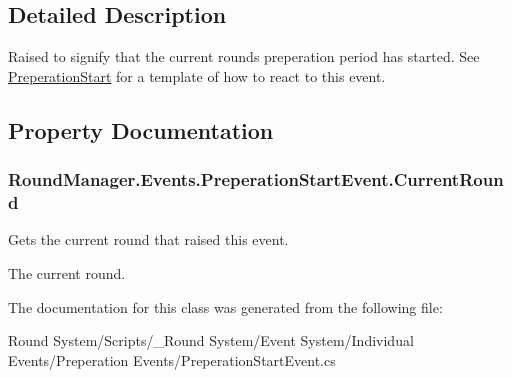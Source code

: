 \subsection{Detailed Description}
Raised to signify that the current rounds preperation period has started. See \hyperlink{class_round_manager_1_1_preperation_start}{Preperation\+Start} for a template of how to react to this event. 



\subsection{Property Documentation}
\hypertarget{class_round_manager_1_1_events_1_1_preperation_start_event_a0636c13306d39f6bcf5bde157012334e}{}
\subsubsection[{Current\+Round}]{ Round\+Manager.\+Events.\+Preperation\+Start\+Event.\+Current\+Round\hspace{0.3cm}{\ttfamily [get]}}\label{class_round_manager_1_1_events_1_1_preperation_start_event_a0636c13306d39f6bcf5bde157012334e}


Gets the current round that raised this event. 

The current round.

The documentation for this class was generated from the following file\+:\begin{DoxyCompactItemize}
\item 
Round System/\+Scripts/\+\_\+\+Round System/\+Event System/\+Individual Events/\+Preperation Events/Preperation\+Start\+Event.\+cs\end{DoxyCompactItemize}
